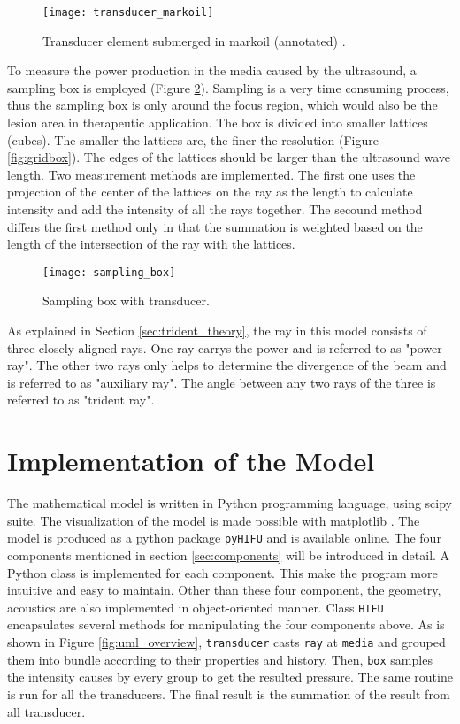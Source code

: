 \begin{figure}[h]
    \centering
    \texttt{[image: transducer\_markoil]}
    \caption{Transducer element submerged in markoil (annotated) \cite{sonavelle} \cite{vanwijk2013}.}
    \label{fig:submerged_transducer}
\end{figure}

To measure the power production in the media caused by the ultrasound, a sampling box is employed (Figure \ref{fig:sampling_box}). Sampling is a very time consuming process, thus the sampling box is only around the focus region, which would also be the lesion area in therapeutic application. The box is divided into smaller lattices (cubes). The smaller the lattices are, the finer the resolution (Figure \ref{fig:gridbox}). The edges of the lattices should be larger than the ultrasound wave length. Two measurement methods are implemented. The first one uses the projection of the center of the lattices on the ray as the length to calculate intensity and add the intensity of all the rays together. The secound method differs the first method only in that the summation is weighted based on the length of the intersection of the ray with the lattices.

\begin{figure}[h]
    \centering
    \texttt{[image: sampling\_box]}
    \caption{Sampling box with transducer.}
    \label{fig:sampling_box}
\end{figure}

As explained in Section \ref{sec:trident_theory}, the ray in this model consists of three closely aligned rays. One ray carrys the power and is referred to as "power ray". The other two rays only helps to determine the divergence of the beam and is referred to as "auxiliary ray". The angle between any two rays of the three is referred to as "trident ray".

\section{Implementation of the Model} \label{sec:implement}
The mathematical model is written in Python programming language, using scipy suite\cite{scipy}. The visualization of the model is made possible with matplotlib \cite{matplotlib}. The model is produced as a python package \texttt{pyHIFU} and is available online. The four components mentioned in section \ref{sec:components} will be introduced in detail. A Python class is implemented for each component. This make the program more intuitive and easy to maintain. Other than these four component, the geometry, acoustics are also implemented in object-oriented manner. Class \texttt{HIFU} encapsulates several methods for manipulating the four components above. As is shown in Figure \ref{fig:uml_overview}, \texttt{transducer} casts \texttt{ray} at \texttt{media} and grouped them into bundle according to their properties and history. Then, \texttt{box} samples the intensity causes by every group to get the resulted pressure. The same routine is run for all the transducers. The final result is the summation of the result from all transducer.

